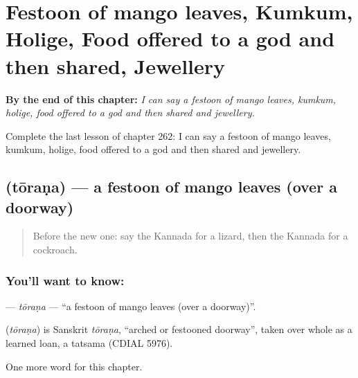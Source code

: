 
\chapter{Festoon of mango leaves, Kumkum, Holige, Food offered to a god and then shared, Jewellery}
\label{ch:ka-festoon-of-mango-leaves-kumkum-holige-food-offered-to-a-god-and-then-shared-jewellery}

\begin{chapteropening}
\textbf{By the end of this chapter:} \emph{I can say a festoon of mango leaves, kumkum, holige, food offered to a god and then shared and jewellery.}

Complete the last lesson of chapter 262: I can say a festoon of mango leaves, kumkum, holige, food offered to a god and then shared and jewellery.
\end{chapteropening}

\section[\texorpdfstring{\kn{ತೋರಣ} (tōraṇa)}{ತೋರಣ (tōraṇa)}]{ (tōraṇa) — a festoon of mango leaves (over a doorway)}

\label{lesson:KA-C262-torana}



\begin{quote}
Before the new one: say the Kannada for a lizard, then the Kannada for a cockroach.
\end{quote}

\subsection*{You'll want to know: }
\textbf{} — \emph{tōraṇa} — \textquotedblleft{}a festoon of mango leaves (over a doorway)\textquotedblright{}.

\begin{cousinweb}
\textbf{} (\emph{tōraṇa}) is Sanskrit \emph{tōraṇa}, \textquotedblleft{}arched or festooned doorway\textquotedblright{}, taken over whole as a learned loan, a tatsama (CDIAL 5976).
\end{cousinweb}

\begin{grammarlens}[title={What you've built}]
One more word for this chapter.
\end{grammarlens}


